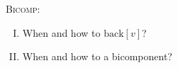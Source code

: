 
\begin{frame}{}
  \centerline{\Large \textsc{Bicomp}: }

  \pause
  \begin{center}
    
  \end{center}
\end{frame}

\begin{frame}{}
  \begin{enumerate}[(I)]
    \centering
    \item When and how to  $\text{back}[v]$? \\[10pt]
    \item When and how to  a bicomponent?
  \end{enumerate}

  \pause
\end{frame}

